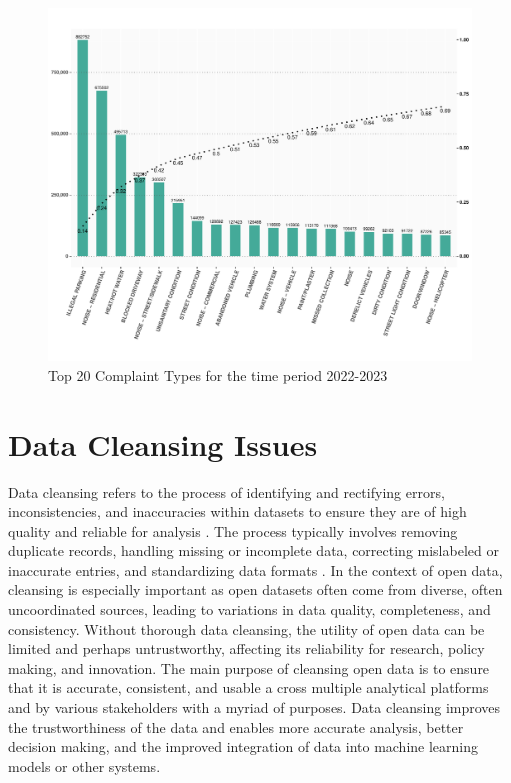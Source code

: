 \documentclass[linenumber]{jdsart}
\begin{document}
\begin{figure}[tbp]
 \centering
  \includegraphics[width = \textwidth]{SR_by_Complaint_Type.pdf} 
  \caption{Top 20 Complaint Types for the time period 2022-2023} 
  \label{fig:SR_complaints}
\end{figure}


\section{Data Cleansing Issues} 
\label{sec:issues}
Data cleansing refers to the process of identifying and rectifying
errors, inconsistencies, and inaccuracies within datasets to ensure
they are of high quality and reliable for analysis
\citep{maletic2005data, hosseinzadeh2023data}. The process
typically involves removing duplicate records, handling missing or
incomplete data, correcting mislabeled or inaccurate entries, and
standardizing data formats \citep[e.g.,][]{cody2017cody,
  van2018statistical}. In the context of open data, cleansing is
especially important as open datasets often come from diverse,
often uncoordinated sources, leading to variations in data quality,
completeness, and consistency. Without thorough data cleansing, 
the utility of open data can be limited and perhaps 
untrustworthy, affecting its reliability for research, 
policy making, and innovation. The main purpose of cleansing 
open data is to ensure that it is accurate, consistent, and usable a
cross multiple analytical platforms and by various stakeholders with a 
myriad of purposes. Data cleansing improves the trustworthiness 
of the data and enables more accurate analysis, 
better decision making, and the improved integration of 
data into machine learning models or other systems.
\end{document}
